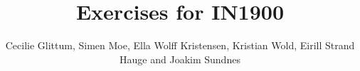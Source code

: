 %
%
%
\documentclass[a4paper, english]{report}

\usepackage{style}
\usepackage{ifikompendiumforside}

%

\newcommand{\py}[1]{\pythoninline{#1}}

\title{Exercises for IN1900}
\author{Cecilie Glittum, Simen Moe, Ella Wolff Kristensen, \newline Kristian Wold, Eirill Strand Hauge and Joakim Sundnes}


\ififorside


\chapter*{Preface}


\chapter{Computing with Formulas}

\chapter{Loops and Lists}

\chapter{Functions and Branching }

\chapter{User Input and Error Handling}

\chapter{Array Computing and Curve Plotting}

\chapter{Dictionaries and Strings}

\chapter{Introduction to Classes}

